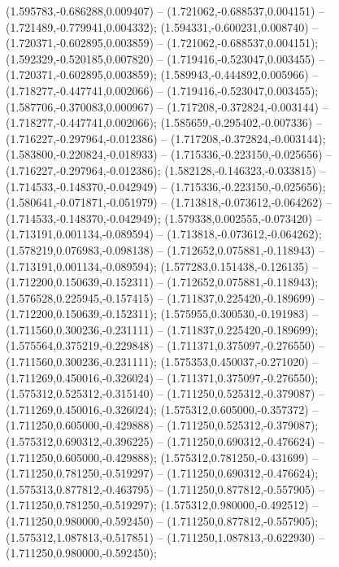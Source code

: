 (1.595783,-0.686288,0.009407) -- (1.721062,-0.688537,0.004151) -- (1.721489,-0.779941,0.004332);
 (1.594331,-0.600231,0.008740) -- (1.720371,-0.602895,0.003859) -- (1.721062,-0.688537,0.004151);
 (1.592329,-0.520185,0.007820) -- (1.719416,-0.523047,0.003455) -- (1.720371,-0.602895,0.003859);
 (1.589943,-0.444892,0.005966) -- (1.718277,-0.447741,0.002066) -- (1.719416,-0.523047,0.003455);
 (1.587706,-0.370083,0.000967) -- (1.717208,-0.372824,-0.003144) -- (1.718277,-0.447741,0.002066);
 (1.585659,-0.295402,-0.007336) -- (1.716227,-0.297964,-0.012386) -- (1.717208,-0.372824,-0.003144);
 (1.583800,-0.220824,-0.018933) -- (1.715336,-0.223150,-0.025656) -- (1.716227,-0.297964,-0.012386);
 (1.582128,-0.146323,-0.033815) -- (1.714533,-0.148370,-0.042949) -- (1.715336,-0.223150,-0.025656);
 (1.580641,-0.071871,-0.051979) -- (1.713818,-0.073612,-0.064262) -- (1.714533,-0.148370,-0.042949);
 (1.579338,0.002555,-0.073420) -- (1.713191,0.001134,-0.089594) -- (1.713818,-0.073612,-0.064262);
 (1.578219,0.076983,-0.098138) -- (1.712652,0.075881,-0.118943) -- (1.713191,0.001134,-0.089594);
 (1.577283,0.151438,-0.126135) -- (1.712200,0.150639,-0.152311) -- (1.712652,0.075881,-0.118943);
 (1.576528,0.225945,-0.157415) -- (1.711837,0.225420,-0.189699) -- (1.712200,0.150639,-0.152311);
 (1.575955,0.300530,-0.191983) -- (1.711560,0.300236,-0.231111) -- (1.711837,0.225420,-0.189699);
 (1.575564,0.375219,-0.229848) -- (1.711371,0.375097,-0.276550) -- (1.711560,0.300236,-0.231111);
 (1.575353,0.450037,-0.271020) -- (1.711269,0.450016,-0.326024) -- (1.711371,0.375097,-0.276550);
 (1.575312,0.525312,-0.315140) -- (1.711250,0.525312,-0.379087) -- (1.711269,0.450016,-0.326024);
 (1.575312,0.605000,-0.357372) -- (1.711250,0.605000,-0.429888) -- (1.711250,0.525312,-0.379087);
 (1.575312,0.690312,-0.396225) -- (1.711250,0.690312,-0.476624) -- (1.711250,0.605000,-0.429888);
 (1.575312,0.781250,-0.431699) -- (1.711250,0.781250,-0.519297) -- (1.711250,0.690312,-0.476624);
 (1.575313,0.877812,-0.463795) -- (1.711250,0.877812,-0.557905) -- (1.711250,0.781250,-0.519297);
 (1.575312,0.980000,-0.492512) -- (1.711250,0.980000,-0.592450) -- (1.711250,0.877812,-0.557905);
 (1.575312,1.087813,-0.517851) -- (1.711250,1.087813,-0.622930) -- (1.711250,0.980000,-0.592450);
